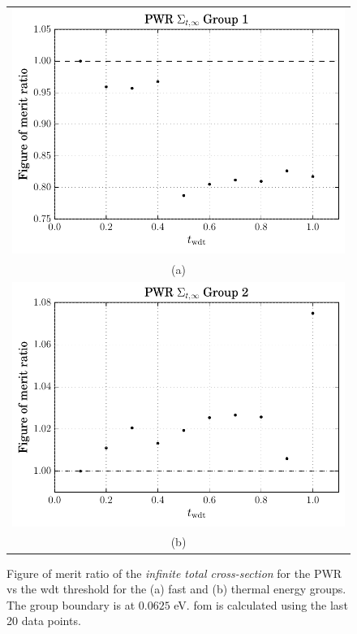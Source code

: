 \begin{figure}[hbtp]
  \centering
  \begin{tabular}{c}
  \includegraphics[scale=0.9]{images/results/pwr_inf_tot_grp_1} \\
    (a) \\
  \includegraphics[scale=0.9]{images/results/pwr_inf_tot_grp_2} \\
    (b) 
  \end{tabular}
  \caption[Figure of merit ratio of the \textit{infinite total cross-section} for the
  PWR]{Figure of merit ratio of the \textit{infinite total cross-section} for the PWR vs the
    \gls{wdt} threshold for the (a) fast and (b) thermal energy
    groups. The group boundary is at $0.0625$ eV. \gls{fom} is
    calculated using the last 20 data points.}
  \label{fig:pwr_inf_tot}
\end{figure}

